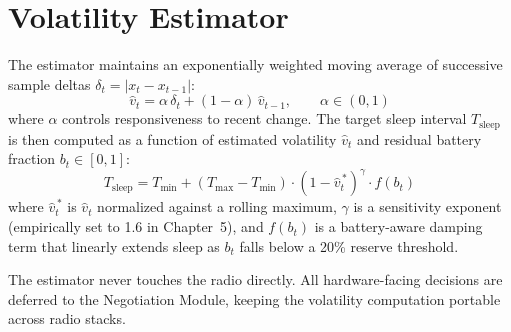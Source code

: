 \section{Volatility Estimator}
The estimator maintains an exponentially weighted moving average of successive sample
deltas $\delta_t = |x_t - x_{t-1}|$:
\begin{equation}
\hat{v}_t = \alpha \, \delta_t + (1-\alpha)\, \hat{v}_{t-1}, \qquad \alpha \in (0,1)
\label{eq:ewma}
\end{equation}
where $\alpha$ controls responsiveness to recent change. The target sleep interval
$T_{\text{sleep}}$ is then computed as a function of estimated volatility $\hat{v}_t$ and
residual battery fraction $b_t \in [0,1]$:
\begin{equation}
T_{\text{sleep}} = T_{\min} + (T_{\max} - T_{\min}) \cdot \left(1 - \hat{v}_t^{\,*}\right)^{\gamma} \cdot f(b_t)
\label{eq:sleep}
\end{equation}
where $\hat{v}_t^{\,*}$ is $\hat{v}_t$ normalized against a rolling maximum, $\gamma$ is a
sensitivity exponent (empirically set to 1.6 in Chapter~5), and $f(b_t)$ is a battery-aware
damping term that linearly extends sleep as $b_t$ falls below a 20\% reserve threshold.

\begin{infobox}[title={\faLock\ Design Invariant}]
The estimator never touches the radio directly. All hardware-facing decisions are deferred to
the Negotiation Module, keeping the volatility computation portable across radio stacks.
\end{infobox}
